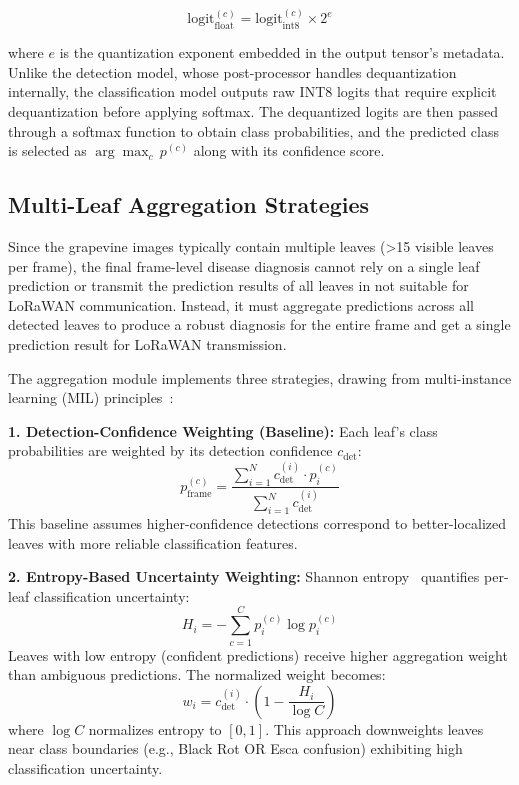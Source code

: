 \begin{equation}
\text{logit}_{\text{float}}^{(c)} = \text{logit}_{\text{int8}}^{(c)} \times 2^{e}
\label{eq:dequant}
\end{equation}

where $e$ is the quantization exponent embedded in the output tensor's metadata. Unlike the detection model, whose post-processor handles dequantization internally, the classification model outputs raw INT8 logits that require explicit dequantization before applying softmax. The dequantized logits are then passed through a softmax function to obtain class probabilities, and the predicted class is selected as $\arg\max_c\, p^{(c)}$ along with its confidence score.

\subsection{Multi-Leaf Aggregation Strategies}
\label{subsec:aggregation_strategies}

Since the grapevine images typically contain multiple leaves (>15 visible leaves per frame), the final frame-level disease diagnosis cannot rely on a single leaf prediction or transmit the prediction results of all leaves in not suitable for LoRaWAN communication. Instead, it must aggregate predictions across all detected leaves to produce a robust diagnosis for the entire frame and get a single prediction result for LoRaWAN transmission. 

The aggregation module implements three strategies, drawing from multi-instance learning (MIL) principles~\cite{dietterich1997solving}:

\textbf{1. Detection-Confidence Weighting (Baseline):} Each leaf's class probabilities are weighted by its detection confidence $c_{\text{det}}$:
\begin{equation}
p_{\text{frame}}^{(c)} = \frac{\sum_{i=1}^{N} c_{\text{det}}^{(i)} \cdot p_i^{(c)}}{\sum_{i=1}^{N} c_{\text{det}}^{(i)}}
\end{equation}
This baseline assumes higher-confidence detections correspond to better-localized leaves with more reliable classification features.

\textbf{2. Entropy-Based Uncertainty Weighting:} Shannon entropy~\cite{shannon1948mathematical} quantifies per-leaf classification uncertainty:
\begin{equation}
H_i = -\sum_{c=1}^{C} p_i^{(c)} \log p_i^{(c)}
\end{equation}
Leaves with low entropy (confident predictions) receive higher aggregation weight than ambiguous predictions. The normalized weight becomes:
\begin{equation}
w_i = c_{\text{det}}^{(i)} \cdot \left(1 - \frac{H_i}{\log C}\right)
\end{equation}
where $\log C$ normalizes entropy to $[0, 1]$. This approach downweights leaves near class boundaries (e.g., Black Rot OR Esca confusion) exhibiting high classification uncertainty.

